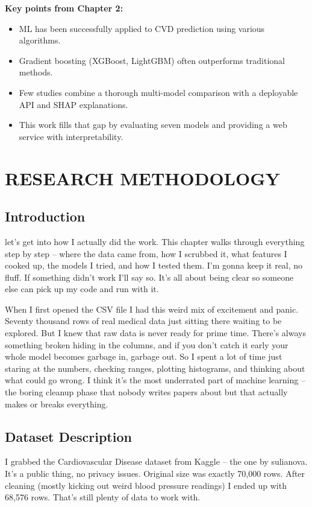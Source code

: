 \documentclass[12pt, a4paper, oneside]{book}
\begin{document}
\begin{takeaway}
\textbf{Key points from Chapter 2:}
\begin{itemize}
  \item ML has been successfully applied to CVD prediction using various algorithms.
  \item Gradient boosting (XGBoost, LightGBM) often outperforms traditional methods.
  \item Few studies combine a thorough multi-model comparison with a deployable API and SHAP explanations.
  \item This work fills that gap by evaluating seven models and providing a web service with interpretability.
\end{itemize}
\end{takeaway}

\chapter{RESEARCH METHODOLOGY}

\section{Introduction}
let's get into how I actually did the work. This chapter walks through everything step by step -- where the data came from, how I scrubbed it, what features I cooked up, the models I tried, and how I tested them. I'm gonna keep it real, no fluff. If something didn't work I'll say so. It's all about being clear so someone else can pick up my code and run with it.

When I first opened the CSV file I had this weird mix of excitement and panic. Seventy thousand rows of real medical data just sitting there waiting to be explored. But I knew that raw data is never ready for prime time. There's always something broken hiding in the columns, and if you don't catch it early your whole model becomes garbage in, garbage out. So I spent a lot of time just staring at the numbers, checking ranges, plotting histograms, and thinking about what could go wrong. I think it's the most underrated part of machine learning -- the boring cleanup phase that nobody writes papers about but that actually makes or breaks everything.

\section{Dataset Description}
I grabbed the Cardiovascular Disease dataset from Kaggle -- the one by sulianova. It's a public thing, no privacy issues. Original size was exactly 70,000 rows. After cleaning (mostly kicking out weird blood pressure readings) I ended up with 68,576 rows. That's still plenty of data to work with.
\end{document}
